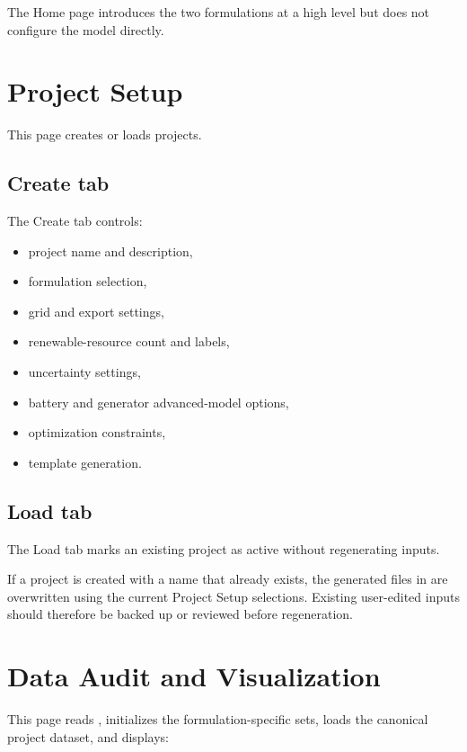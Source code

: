 \documentclass[11pt,a4paper]{report}
\begin{document}
The Home page introduces the two formulations at a high level but does not configure the model directly.

\section{Project Setup}

This page creates or loads projects.

\subsection{Create tab}

The Create tab controls:

\begin{itemize}[leftmargin=1.5em]
  \item project name and description,
  \item formulation selection,
  \item grid and export settings,
  \item renewable-resource count and labels,
  \item uncertainty settings,
  \item battery and generator advanced-model options,
  \item optimization constraints,
  \item template generation.
\end{itemize}

\subsection{Load tab}

The Load tab marks an existing project as active without regenerating inputs.

\begin{guidenote}
If a project is created with a name that already exists, the generated files in  are overwritten using the current Project Setup selections. Existing user-edited inputs should therefore be backed up or reviewed before regeneration.
\end{guidenote}

\section{Data Audit and Visualization}

This page reads , initializes the formulation-specific sets, loads the canonical project dataset, and displays:
\end{document}
